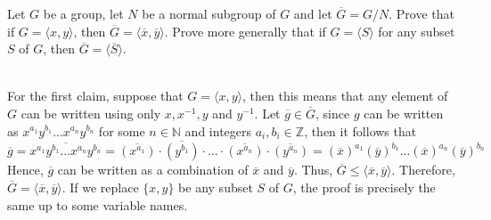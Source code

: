 \begin{exercise}
    Let $G$ be a group, let $N$ be a normal subgroup of $G$ and let $\overline{G} = G/N$. Prove that if $G = \langle x,y \rangle$, then $\overline{G} = \langle \overline{x}, \overline{y} \rangle$. Prove more generally that if $G = \langle S \rangle$ for any subset $S$ of $G$, then $\overline{G} = \langle \overline{S} \rangle$. \\
\end{exercise}

\begin{solution}
    \\ For the first claim, suppose that $G = \langle x,y \rangle$, then this means that any element of $G$ can be written using only $x, x^{-1}, y$ and $y^{-1}$. Let $\overline{g} \in \overline{G}$, since $g$ can be written as $x^{a_1}y^{b_1}...x^{a_n}y^{b_n}$ for some $n \in \mathbb{N}$ and integers $a_i, b_i \in \mathbb{Z}$, then it follows that 
    $$\overline{g} = \overline{x^{a_1}y^{b_1}...x^{a_n}y^{b_n}} = \overline{(x^{a_1})} \cdot \overline{(y^{b_1})} \cdot ... \cdot \overline{(x^{a_n})} \cdot \overline{(y^{a_n})} = (\overline{x})^{a_1}(\overline{y})^{b_1}...(\overline{x})^{a_n}(\overline{y})^{b_n}$$
    Hence, $\overline{g}$ can be written as a combination of $\overline{x}$ and $\overline{y}$. Thus, $\overline{G} \leq \langle \overline{x}, \overline{y} \rangle$. Therefore, $\overline{G} = \langle \overline{x}, \overline{y} \rangle$. If we replace $\{x,y\}$ be any subset $S$ of $G$, the proof is precisely the same up to some variable names. \\
\end{solution}

